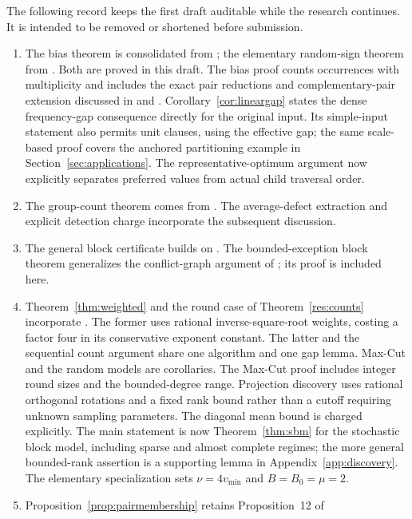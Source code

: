 \documentclass[11pt,a4paper]{article}
\theoremstyle{definition}
\theoremstyle{remark}
\begin{document}
The following record keeps the first draft auditable while the research
continues. It is intended to be removed or shortened before submission.
\begin{enumerate}
\item The bias theorem is consolidated from
; the elementary random-sign theorem
from . Both are proved in this draft.
The bias proof counts occurrences with multiplicity and includes the exact
pair reductions and complementary-pair extension discussed in
 and
. Corollary~\ref{cor:lineargap} states the
dense frequency-gap consequence directly for the original input.
Its simple-input statement also permits unit clauses, using the effective
gap; the same scale-based proof covers the anchored partitioning example
in Section~\ref{sec:applications}. The representative-optimum argument now
explicitly separates preferred values from actual child traversal order.
\item The group-count theorem comes from
. The average-defect extraction
and explicit detection charge incorporate the subsequent discussion.
\item The general block certificate builds on
. The bounded-exception block
theorem generalizes the conflict-graph argument of
; its proof is included here.
\item Theorem~\ref{thm:weighted} and the round case of
Theorem~\ref{res:counts} incorporate .
The former uses rational inverse-square-root weights, costing a factor
four in its conservative exponent constant. The latter and the sequential
count argument share one algorithm and one gap lemma. Max-Cut and the random
models are corollaries. The Max-Cut proof includes integer round sizes and
the bounded-degree range. Projection discovery uses rational orthogonal
rotations and a fixed rank bound rather than a cutoff requiring unknown
sampling parameters. The diagonal mean bound is charged explicitly.
The main statement is now Theorem~\ref{thm:sbm} for the stochastic block
model, including sparse and almost complete regimes; the more general
bounded-rank assertion is a supporting lemma in
Appendix~\ref{app:discovery}. The elementary specialization sets
$\nu=4v_{\min}$ and $B=B_0=\mu=2$.
\item Proposition~\ref{prop:pairmembership} retains Proposition~12 of

\end{enumerate}
\end{document}
